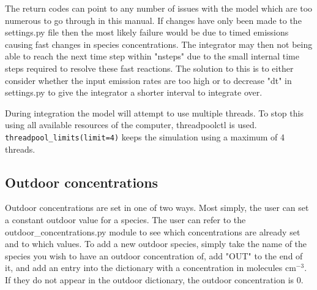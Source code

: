 \documentclass[a4paper]{refart}
\begin{document}
The return codes can point to any number of issues with the model which are too numerous to go through in this manual. If changes have only been made to the settings.py file then the most likely failure would be due to timed emissions causing fast changes in species concentrations. The integrator may then not being able to reach the next time step within "nsteps" due to the small internal time steps required to resolve these fast reactions. The solution to this is to either consider whether the input emission rates are too high or to decrease "dt" in settings.py to give the integrator a shorter interval to integrate over.



During integration the model will attempt to use multiple threads. To stop this using all available resources of the computer, threadpoolctl is used. \texttt{threadpool\_limits(limit=4)} keeps the simulation using a maximum of 4 threads.


\subsection{Outdoor concentrations}\label{outdoor_concentrations.py}
Outdoor concentrations are set in one of two ways. Most simply, the user can set a constant outdoor value for a species. The user can refer to the outdoor\_concentrations.py module to see which concentrations are already set and to which values. To add a new outdoor species, simply  take the name of the species you wish to have an outdoor concentration of, add "OUT" to the end of it, and add an entry into the dictionary with a concentration in molecules cm$^{-3}$. If they do not appear in the outdoor dictionary, the outdoor concentration is 0.
\end{document}
